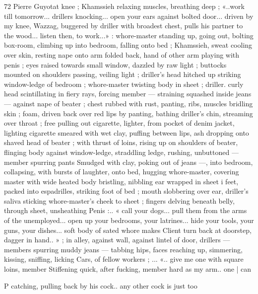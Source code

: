 72 Pierre Guyotat
knee ; Khamssieh relaxing muscles, breathing deep ; «..work till
tomorrow... drillers knocking... open your ears against bolted door...
driven by my knee, Wazzag, buggered by driller with broadest chest,
pulls his partner to the wood... listen then, to work...» : whore-master
standing up, going out, bolting box-room, climbing up into bedroom,
falling onto bed ; Khamssieh, sweat cooling over skin, resting nape
onto arm folded back, hand of other arm playing with penis ; eyes
raised towards small window, dazzled by raw light ; buttocks mounted
on shoulders passing, veiling light ; driller's head hitched up striking
window-ledge of bedroom ; whore-master twisting body in sheet ;
driller. curly head scintillating in fiery rays, forcing member —
straining squashed inside jeans — against nape of beater ; chest
rubbed with rust, panting, ribs, muscles bridling skin ; foam, driven
back over red lips by panting, bathing driller's chin, streaming over
throat ; free pulling out cigarette, lighter, from pocket of denim
jacket, lighting cigarette smeared with wet clay, puffing between lips,
ash dropping onto shaved head of beater ; with thrust of loins, rising
up on shoulders of beater, flinging body against window-ledge,
straddling ledge, rushing, unbuttoned — member spurring pants
Smudged with clay, poking out of jeans —, into bedroom, collapsing,
with bursts of laughter, onto bed, hugging whore-master, covering
master with wide heated body bristling, nibbling ear wrapped in sheet
i feet, packed into espadrilles, striking foot of bed ; mouth
slobbering over ear, driller's saliva sticking whore-master's cheek to
sheet ; fingers delving beneath belly, through sheet, unsheathing
Penis :.. « call your dogs... pull them from the arms of the
unemployed... open up your bedrooms, your latrines... hide your
tools, your guns, your dishes... soft body of sated whore makes
Client turn back at doorstep, dagger in hand.. » ; in alley, against wall,
against lintel of door, drillers — members spurring muddy jeans —
tabbing hips, faces reaching up, simmering, kissing, sniffing, licking
Cars, of fellow workers ; ... «.. give me one with square loins, member
Stiffening quick, after fucking, member hard as my arm.. one | can

P catching, pulling back by his cock.. any other cock is just too

